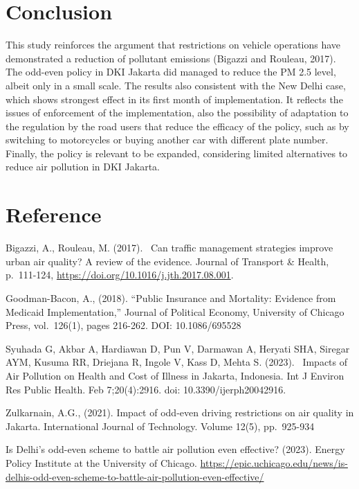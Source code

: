 \documentclass[
]{article}
\begin{document}
\hypertarget{conclusion}{%
\section{Conclusion}\label{conclusion}}

This study reinforces the argument that restrictions on vehicle
operations have demonstrated a reduction of pollutant emissions (Bigazzi
and Rouleau, 2017). The odd-even policy in DKI Jakarta did managed to
reduce the PM 2.5 level, albeit only in a small scale. The results also
consistent with the New Delhi case, which shows strongest effect in its
first month of implementation. It reflects the issues of enforcement of
the implementation, also the possibility of adaptation to the regulation
by the road users that reduce the efficacy of the policy, such as by
switching to motorcycles or buying another car with different plate
number. Finally, the policy is relevant to be expanded, considering
limited alternatives to reduce air pollution in DKI Jakarta.

\hypertarget{reference}{%
\section{Reference}\label{reference}}

Bigazzi, A., Rouleau, M. (2017).~ Can traffic management strategies
improve urban air quality? A review of the evidence. Journal of
Transport \& Health, p.~111-124,
\url{https://doi.org/10.1016/j.jth.2017.08.001}.

Goodman-Bacon, A., (2018). ``Public Insurance and Mortality: Evidence
from Medicaid Implementation,'' Journal of Political Economy, University
of Chicago Press, vol.~126(1), pages 216-262. DOI: 10.1086/695528

Syuhada G, Akbar A, Hardiawan D, Pun V, Darmawan A, Heryati SHA, Siregar
AYM, Kusuma RR, Driejana R, Ingole V, Kass D, Mehta S. (2023).~ Impacts
of Air Pollution on Health and Cost of Illness in Jakarta, Indonesia.
Int J Environ Res Public Health. Feb 7;20(4):2916. doi:
10.3390/ijerph20042916.~

Zulkarnain, A.G., (2021). Impact of odd-even driving restrictions on air
quality in Jakarta. International Journal of Technology. Volume 12(5),
pp.~925-934

Is Delhi's odd-even scheme to battle air pollution even effective?
(2023). Energy Policy Institute at the University of Chicago.
\url{https://epic.uchicago.edu/news/is-delhis-odd-even-scheme-to-battle-air-pollution-even-effective/}
\end{document}

